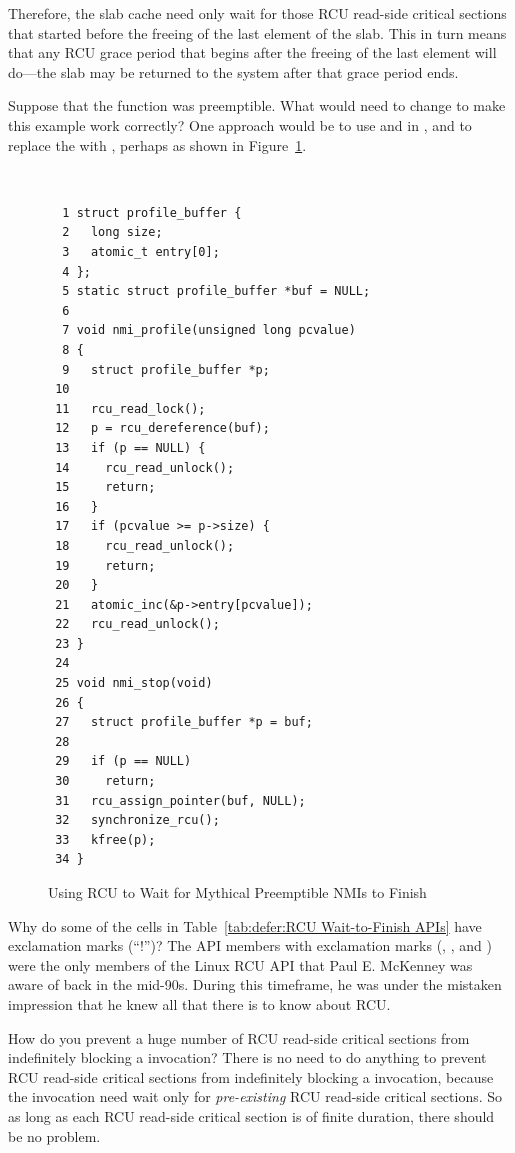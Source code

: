 \begin{enumerate}
	Therefore, the slab cache need only wait for those RCU read-side
	critical sections that started before the freeing of the last element
	of the slab.
	This in turn means that any RCU grace period that begins after
	the freeing of the last element will do---the slab may be returned
	to the system after that grace period ends.

\QuickQ{}
	Suppose that the  function was preemptible.
	What would need to change to make this example work correctly?
\QuickA{}
	One approach would be to use
	 and 
	in , and to replace the
	 with ,
	perhaps as shown in
	Figure~\ref{fig:defer:Using RCU to Wait for Mythical Preemptible NMIs to Finish}.

\begin{figure}[tbp]
{ \tt \scriptsize
\begin{verbatim}
  1 struct profile_buffer {
  2   long size;
  3   atomic_t entry[0];
  4 };
  5 static struct profile_buffer *buf = NULL;
  6
  7 void nmi_profile(unsigned long pcvalue)
  8 {
  9   struct profile_buffer *p;
 10
 11   rcu_read_lock();
 12   p = rcu_dereference(buf);
 13   if (p == NULL) {
 14     rcu_read_unlock();
 15     return;
 16   }
 17   if (pcvalue >= p->size) {
 18     rcu_read_unlock();
 19     return;
 20   }
 21   atomic_inc(&p->entry[pcvalue]);
 22   rcu_read_unlock();
 23 }
 24
 25 void nmi_stop(void)
 26 {
 27   struct profile_buffer *p = buf;
 28
 29   if (p == NULL)
 30     return;
 31   rcu_assign_pointer(buf, NULL);
 32   synchronize_rcu();
 33   kfree(p);
 34 }
\end{verbatim}
}
\caption{Using RCU to Wait for Mythical Preemptible NMIs to Finish}
\label{fig:defer:Using RCU to Wait for Mythical Preemptible NMIs to Finish}
\end{figure}


\QuickQ{}
	Why do some of the cells in
	Table~\ref{tab:defer:RCU Wait-to-Finish APIs}
	have exclamation marks (``!'')?
\QuickA{}
	The API members with exclamation marks (,
	, and ) were the
	only members of the Linux RCU API that Paul E. McKenney was aware
	of back in the mid-90s.
	During this timeframe, he was under the mistaken impression that
	he knew all that there is to know about RCU.

\QuickQ{}
	How do you prevent a huge number of RCU read-side critical
	sections from indefinitely blocking a 
	invocation?
\QuickA{}
	There is no need to do anything to prevent RCU read-side
	critical sections from indefinitely blocking a
	 invocation, because the
	 invocation need wait only for
	\emph{pre-existing} RCU read-side critical sections.
	So as long as each RCU read-side critical section is
	of finite duration, there should be no problem.


\end{enumerate}
